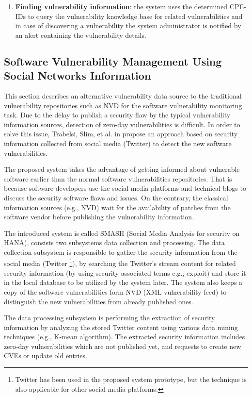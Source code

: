 \documentclass{llncs}
\begin{document}
\begin{enumerate}
   \item \textbf{Finding vulnerability information}: the system uses the determined CPE-IDs to query the vulnerability knowledge base for related vulnerabilities and in case of discovering a vulnerability  the system administrator is notified by an alert containing the vulnerability details.      
   
 
 \end{enumerate}

\subsection{Software	Vulnerability	Management	Using	Social	Networks	Information	}

\par This section describes an alternative vulnerability data source to the traditional vulnerability repositories such as NVD for the software vulnerability monitoring task. Due to the  delay to publish a security flaw  by the typical vulnerability information sources,  detection of zero-day vulnerabilities is difficult.  In order to solve this issue,  Trabelsi, Slim, et al. in \cite{paper2} propose an approach based on security information collected from social media (Twitter) to detect the new software vulnerabilities.


\par
The proposed system takes the advantage of getting informed about vulnerable software earlier than the normal software vulnerabilities repositories. That is because software developers use the social media platforms and technical blogs to discuss the security software flaws and issues. On the contrary, the classical information sources (e.g., NVD) wait for the availability of patches from the software vendor before publishing the vulnerability information.

\par The introduced system is called SMASH (Social Media Analysis for security on HANA), consists two subsystems data collection and processing. The data collection subsystem is responsible to gather the security information from the social media (Twitter \footnote{Twitter has been used in the proposed system prototype, but the technique is also applicable for other social media platforms.}), by searching the Twitter's stream content for related security information (by using security associated terms e.g., exploit) and store it in the local database to be utilized by the system later. The system also keeps a copy of the software vulnerabilities form NVD (XML vulnerability feed) to distinguish the new  vulnerabilities from already published ones.
\par
The data processing subsystem is performing the extraction of security information by analyzing the stored Twitter content using various data mining techniques (e.g., K-mean algorithm). The extracted security information 
includes zero-day vulnerabilities which are not published yet, and requests to create new CVEs or update old entries.
\end{document}

